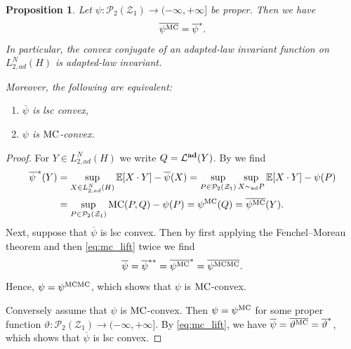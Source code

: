 \documentclass[a4paper]{amsart}
\numberwithin{theorem}{section}
\newtheorem{proposition}[theorem]{Proposition}
\theoremstyle{definition}
\newcommand{\E}{\mathbb{E}}
\newcommand{\law}{\mathcal{L}}
\newcommand{\Pc}{\mathcal P}
\newcommand{\simad}{\sim_{\mathrm{ad}}}
\renewcommand{\H}{H}
\newcommand{\mc}{\textup{MC}}
\newcommand{\Zc}{\mathcal{Z}}
\newcommand{\lawadd}{\law^{\textnormal{\textbf{ad}}}}
\begin{document}
\begin{proposition}\label{prop:MCcvx_FP}
Let $\psi : \Pc_2(\Zc_1) \to (-\infty,+\infty]$ be proper. Then we have 
\begin{align}\label{eq:mc_lift}
\overline{\psi^\mc} = \overline{\psi}^\ast.
\end{align}
In particular, the convex conjugate of an adapted-law invariant function on $L_{2,ad}^N(\H)$ is adapted-law invariant.

Moreover, the following are equivalent:
\begin{enumerate}
    \item $\overline{\psi}$ is lsc convex,
    \item $\psi$ is $\mc$-convex.
\end{enumerate}   
\end{proposition}
\begin{proof}
For $Y \in L_{2,ad}^N(H)$ we write $Q =\lawadd(Y)$. By  we find
\begin{align*}
   \overline{\psi\,}^\ast(Y) &= \sup_{X \in L_{2,ad}^N(\H) } \E[ X \cdot Y ] - \overline{\psi}(X) = \sup_{ P \in \Pc_2(\Zc_1)}  \sup_{X \simad P} \E[X \cdot Y]   -  \psi(P) \\
   &= \sup_{P \in \Pc_2(\Zc_1) } \mc(P,Q) - \psi(P)  = \psi^{\mc}(Q) = \overline{\psi^{\mc}}(Y).
\end{align*}
Next, suppose that $\overline{\psi}$ is lsc convex. Then by first applying the Fenchel--Moreau theorem and then \eqref{eq:mc_lift} twice we find
\[
\overline{\psi} = \overline{\psi}^{\ast\ast} = \overline{\psi^\mc}^\ast = \overline{\psi^{\mc\mc}}.
\]
Hence, $\psi = \psi^{\mc\mc}$, which shows that $\psi$ is $\mc$-convex. 

Conversely assume that $\psi$ is $\mc$-convex. Then $\psi = \psi^{\mc}$ for some proper function $\vartheta : \Pc_2(\Zc_1) \to (-\infty,+\infty]$. By \eqref{eq:mc_lift}, we have $\overline{\psi} = \overline{\vartheta^\mc} = \overline{\vartheta}^\ast$, which shows that $\overline{\psi}$ is lsc convex. 
\end{proof}
\end{document}
